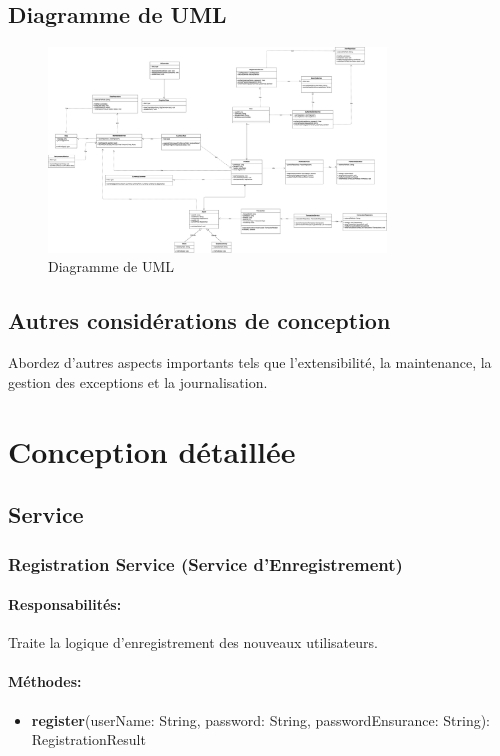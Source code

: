 \documentclass{article}
\begin{document}
\subsection{Diagramme de UML}
\begin{figure}[h]
    \centering
    \includegraphics[width=0.8\textwidth]{../analysises/UML/V1.0/UMLV1.4.png}
    \caption{Diagramme de UML}
    \label{fig:UML}
\end{figure}

\subsection{Autres considérations de conception}

Abordez d'autres aspects importants tels que l'extensibilité, la maintenance, la gestion des exceptions et la journalisation.


\section{Conception détaillée}
\subsection{Service}
\subsubsection{Registration Service (Service d'Enregistrement)}
\paragraph{Responsabilités:} Traite la logique d'enregistrement des nouveaux utilisateurs.
\paragraph{Méthodes:}
\begin{itemize}
  \item \textbf{register}(userName: String, password: String, passwordEnsurance: String): RegistrationResult
\end{itemize}
\end{document}
